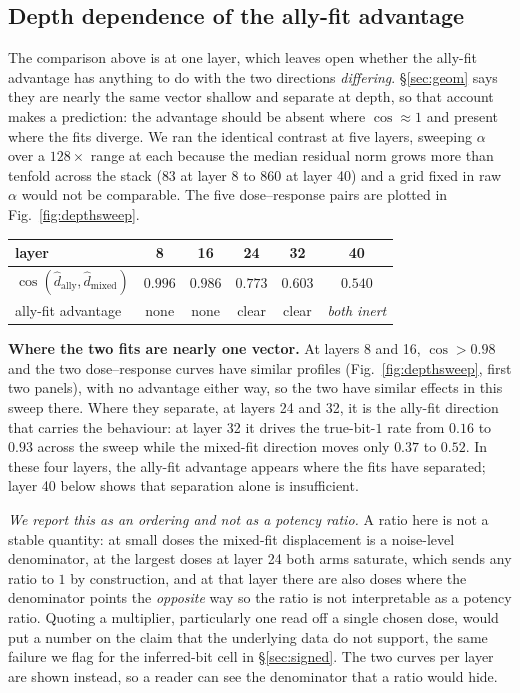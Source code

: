 \documentclass{article}
\begin{document}
\subsection{Depth dependence of the ally-fit advantage}
\label{sec:depth}

The comparison above is at one layer, which leaves open whether the ally-fit advantage has anything to do
with the two directions \emph{differing}. \S\ref{sec:geom} says they are nearly the same vector shallow and
separate at depth, so that account makes a prediction: the advantage should be absent where
$\cos \approx 1$ and present where the fits diverge. We ran the identical contrast at five layers, sweeping
$\alpha$ over a $128\times$ range at each because the median residual norm grows more than tenfold across the
stack ($83$ at layer 8 to $860$ at layer 40) and a grid fixed in raw $\alpha$ would not be comparable.
The five dose--response pairs are plotted in Fig.~\ref{fig:depthsweep}.

\begin{center}
\footnotesize
\setlength{\tabcolsep}{5pt}
\begin{tabular}{lccccc}
\toprule
layer & 8 & 16 & 24 & 32 & 40 \\
\midrule
$\cos(\hat d_{\mathrm{ally}}, \hat d_{\mathrm{mixed}})$ & $0.996$ & $0.986$ & $0.773$ & $0.603$ & $0.540$ \\
ally-fit advantage & none & none & clear & clear & \emph{both inert} \\
\bottomrule
\end{tabular}
\end{center}

\textbf{Where the two fits are nearly one vector.} At layers 8 and 16,
$\cos > 0.98$ and the two dose--response curves have similar profiles (Fig.~\ref{fig:depthsweep}, first two panels), with no advantage either way, so the two have similar effects in this sweep there. Where they separate, at layers 24 and 32, it is the ally-fit
direction that carries the behaviour: at layer 32 it drives the true-bit-$1$ rate from $0.16$ to $0.93$
across the sweep while the mixed-fit direction moves only $0.37$ to $0.52$. In these four layers, the ally-fit advantage appears where the fits have separated; layer 40 below shows that separation alone is insufficient.

\emph{We report this as an ordering and not as a potency ratio.} A ratio here is not a
stable quantity: at small doses the mixed-fit displacement is a noise-level denominator, at the largest doses at
layer 24 both arms saturate, which sends any ratio to $1$ by construction, and at that layer there are also doses where the
denominator points the \emph{opposite} way so the ratio is not interpretable as a potency ratio. Quoting a multiplier, particularly one read off a single chosen dose, would put a number on the claim that the
underlying data do not support, the same failure we flag for the inferred-bit cell in \S\ref{sec:signed}.
The two curves per layer are shown instead, so a reader can see the denominator that a ratio would hide.
\end{document}
